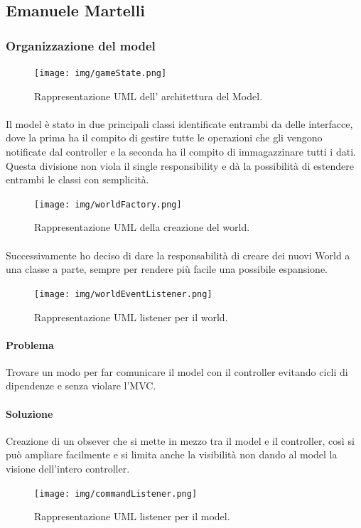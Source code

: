 \documentclass[a4paper,12pt]{report}
\begin{document}
\subsection*{Emanuele Martelli}
%
\subsubsection*{Organizzazione del model}
%
\begin{figure}[H]
	\centering{}
	\texttt{[image: img/gameState.png]}
	\caption{Rappresentazione UML dell' architettura del Model.}
	\end{figure}
%
\paragraph{} Il model è stato in due principali classi identificate entrambi da delle interfacce, dove la prima ha il compito di gestire tutte le operazioni che gli vengono notificate dal controller e la seconda ha il compito di immagazzinare tutti i dati. Questa divisione non viola il single responsibility e dà la possibilità di estendere entrambi le classi con semplicità.
%
\begin{figure}[H]
	\centering{}
	\texttt{[image: img/worldFactory.png]}
	\caption{Rappresentazione UML della creazione del world.}
	\end{figure}
%
\paragraph{} Successivamente ho deciso di dare la responsabilità di creare dei nuovi World a una classe a parte, sempre per rendere più facile una possibile espansione.
%
\begin{figure}[H]
	\centering{}
	\texttt{[image: img/worldEventListener.png]}
	\caption{Rappresentazione UML listener per il world.}
	\end{figure}
%
\paragraph*{Problema} Trovare un modo per far comunicare il model con il controller evitando cicli di dipendenze e senza violare l’MVC.
\paragraph*{Soluzione} Creazione di un obsever che si mette in mezzo tra il model e il controller, così si può ampliare facilmente e si limita anche la visibilità non dando al model la visione dell’intero controller.
%
\begin{figure}[H]
	\centering{}
	\texttt{[image: img/commandListener.png]}
	\caption{Rappresentazione UML listener per il model.}
	\label{img:strategy}
	\end{figure}
%
\end{document}
